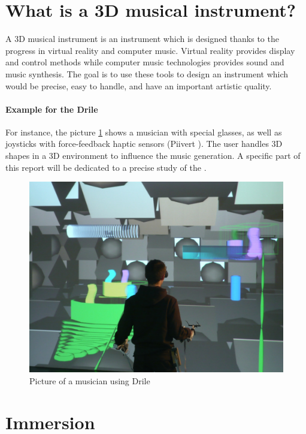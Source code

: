 \newpage
\section{What is a 3D musical instrument?}
A 3D musical instrument is an instrument which is designed thanks to the progress in virtual reality and computer music.
Virtual reality provides display and control methods while computer music technologies provides sound and music synthesis. The goal is to use these tools to design an instrument which would be precise, easy to handle, and have an important artistic quality.

\paragraph{Example for the Drile}
For instance, the picture \ref{fig:drile} shows a musician with special glasses, as well as joysticks with force-feedback haptic sensors (Piivert \cite{berthaut2010piivert}). 
The user handles 3D shapes in a 3D environment to influence the music generation. A specific part of this report will be dedicated to a precise study of the .

\begin{figure}[t]
\centering
\includegraphics[scale=0.3]{image/drile.jpg}
\caption{Picture of a musician using Drile}
\label{fig:drile}
\end{figure}

\newpage
\section{Immersion}
